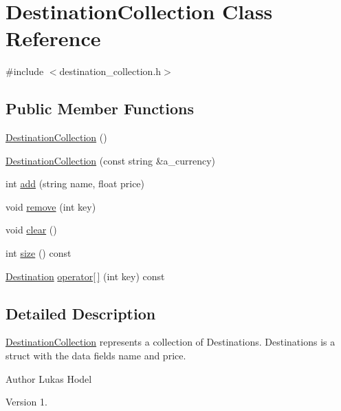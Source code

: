 \hypertarget{classDestinationCollection}{\section{Destination\-Collection Class Reference}
\label{classDestinationCollection}
}


{\ttfamily \#include $<$destination\-\_\-collection.\-h$>$}

\subsection*{Public Member Functions}
\begin{DoxyCompactItemize}
\item 
\hyperlink{classDestinationCollection_a8cd302a3be128dde1c742a40268d0768}{Destination\-Collection} ()
\item 
\hyperlink{classDestinationCollection_a5cf92d21f3b245d6ac46409d2bd8da1e}{Destination\-Collection} (const string \&a\-\_\-currency)
\item 
int \hyperlink{classDestinationCollection_abe6e5181031cc5db9bac4b6a39000964}{add} (string name, float price)
\item 
void \hyperlink{classDestinationCollection_a764aaa3f333fc5d0bc6101e35e2bfbaa}{remove} (int key)
\item 
void \hyperlink{classDestinationCollection_a27de949dd04a84f108f246a579b22fdc}{clear} ()
\item 
int \hyperlink{classDestinationCollection_a35325e80b3ba8d6e935c7474463c9434}{size} () const 
\item 
\hyperlink{structDestination}{Destination} \hyperlink{classDestinationCollection_af0552ec87e81f036994e8d9838bc36ea}{operator\mbox{[}$\,$\mbox{]}} (int key) const 
\end{DoxyCompactItemize}


\subsection{Detailed Description}
\hyperlink{classDestinationCollection}{Destination\-Collection} represents a collection of Destinations. Destinations is a struct with the data fields name and price.

\begin{DoxyAuthor}{Author}
Lukas Hodel 
\end{DoxyAuthor}
\begin{DoxyVersion}{Version}
1. 
\end{DoxyVersion}


